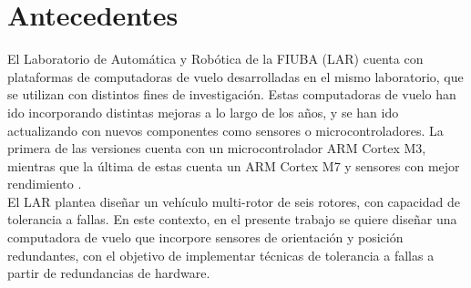 \section{Antecedentes}

El Laboratorio de Automática y Robótica de la FIUBA (LAR) cuenta con plataformas de computadoras de vuelo desarrolladas en el mismo laboratorio, que se utilizan con distintos fines de investigación. Estas computadoras de vuelo han ido incorporando distintas mejoras a lo largo de los años, y se han ido actualizando con nuevos componentes como sensores o microcontroladores. La primera de las versiones cuenta con un microcontrolador ARM Cortex M3, mientras que la última de estas cuenta un ARM Cortex M7 y sensores con mejor rendimiento \cite{garberoglio2019diseno}.\\


El LAR plantea diseñar un vehículo multi-rotor de seis rotores, con capacidad de tolerancia a fallas. %
En este contexto, en el presente trabajo se quiere diseñar una computadora de vuelo que incorpore sensores de orientación y posición redundantes, con el objetivo de implementar técnicas de tolerancia a fallas a partir de redundancias de hardware.






